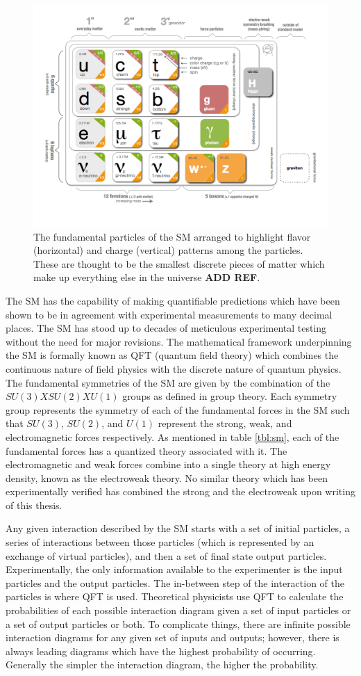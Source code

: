 \begin{figure}[!ht]
\begin{center}
\includegraphics[width=0.65\linewidth]{figs/standard_model_chart.png}
\caption{The fundamental particles of the SM arranged to highlight flavor (horizontal) and charge (vertical) patterns among the particles. These are thought to be the smallest discrete pieces of matter which make up everything else in the universe \textbf{ADD REF}.}
\end{center}
\label{fig:stnd_mdl_chart}
\end{figure}

The SM has the capability of making quantifiable predictions which have been shown to be in agreement with experimental measurements to many decimal places. The SM has stood up to decades of meticulous experimental testing without the need for major revisions. The mathematical framework underpinning the SM is formally known as QFT (quantum field theory) which combines the continuous nature of field physics with the discrete nature of quantum physics. The fundamental symmetries of the SM are given by the combination of the $SU(3)XSU(2)XU(1)$ groups as defined in group theory. Each symmetry group represents the symmetry of each of the fundamental forces in the SM such that $SU(3)$, $SU(2)$, and $U(1)$ represent the strong, weak, and electromagnetic forces respectively. As mentioned in table \ref{tbl:sm}, each of the fundamental forces has a quantized theory associated with it. The electromagnetic and weak forces combine into a single theory at high energy density, known as the electroweak theory. No similar theory which has been experimentally verified has combined the strong and the electroweak upon writing of this thesis.

Any given interaction described by the SM starts with a set of initial particles, a series of interactions between those particles (which is represented by an exchange of virtual particles), and then a set of final state output particles. Experimentally, the only information available to the experimenter is the input particles and the output particles. The in-between step of the interaction of the particles is where QFT is used. Theoretical physicists use QFT to calculate the probabilities of each possible interaction diagram given a set of input particles or a set of output particles or both. To complicate things, there are infinite possible interaction diagrams for any given set of inputs and outputs; however, there is always leading diagrams which have the highest probability of occurring. Generally the simpler the interaction diagram, the higher the probability.

